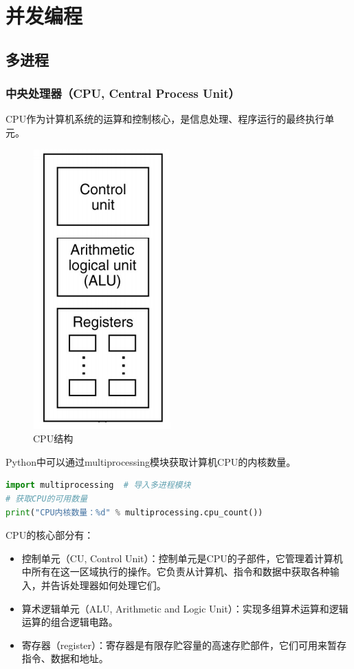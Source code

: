 \chapter{并发编程}

\section{多进程}

\subsection{中央处理器（CPU, Central Process Unit）}

CPU作为计算机系统的运算和控制核心，是信息处理、程序运行的最终执行单元。

\begin{figure}[H]
	\centering
	\includegraphics[scale=0.7]{img/C11/11-1/1.png}
	\caption{CPU结构}
\end{figure}

Python中可以通过multiprocessing模块获取计算机CPU的内核数量。\\


\begin{lstlisting}[language=Python]
import multiprocessing	# 导入多进程模块
# 获取CPU的可用数量
print("CPU内核数量：%d" % multiprocessing.cpu_count())
\end{lstlisting}

CPU的核心部分有：

\begin{itemize}
	\item 控制单元（CU, Control Unit）：控制单元是CPU的子部件，它管理着计算机中所有在这一区域执行的操作。它负责从计算机、指令和数据中获取各种输入，并告诉处理器如何处理它们。

	\item 算术逻辑单元（ALU, Arithmetic and Logic Unit）：实现多组算术运算和逻辑运算的组合逻辑电路。

	\item 寄存器（register）：寄存器是有限存贮容量的高速存贮部件，它们可用来暂存指令、数据和地址。
\end{itemize}

